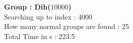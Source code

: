\textbf{Group : Dih($10000$)}\\
Searching up to index : 4000\\
How many normal groups are found : 25\\
Total Time in s : 223.5\\

